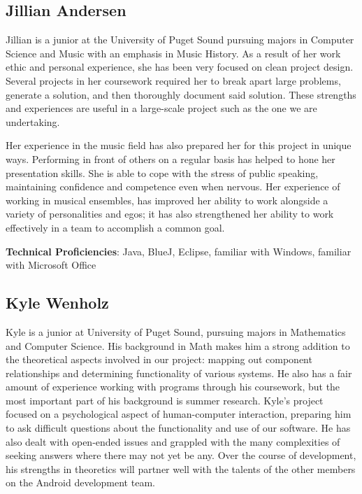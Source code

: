 \documentclass[12pt]{article}
\begin{document}
\subsection{Jillian Andersen}
Jillian is a junior at the University of Puget Sound pursuing majors in Computer Science and Music
with an emphasis in Music History. As a result of her work ethic and personal experience, she has been very focused on clean project design. Several projects in her coursework required her to break apart large problems, generate a solution, and then thoroughly document said solution.  These strengths and experiences are
useful in a large-scale project such as the one we are undertaking.

Her experience in the music field has also prepared her for this project in unique ways.
Performing in front of others on a regular basis has helped to hone her presentation skills. She is
able to cope with the stress of public speaking, maintaining confidence and competence even when
nervous. Her experience of working in musical ensembles, has improved her ability to work
alongside a variety of personalities and egos; it has also strengthened her ability to work
effectively in a team to accomplish a common goal.

\vspace*{5mm}

\noindent \textbf{Technical Proficiencies}: Java, BlueJ, Eclipse, familiar with Windows, familiar with Microsoft Office


\subsection{Kyle Wenholz}
Kyle is a junior at University of Puget Sound, pursuing majors in Mathematics and Computer Science.  His background in Math makes him a strong addition to the theoretical aspects involved in our project: mapping out component relationships and determining functionality of various systems.  He also has a fair amount of experience working with programs through his coursework, but the most important part of his background is summer research.  Kyle's project focused on a psychological aspect of human-computer interaction, preparing him to ask difficult questions about the functionality and use of our software.  He has also dealt with open-ended issues and grappled with the many complexities of seeking answers where there may not yet be any.  Over the course of development, his strengths in theoretics will partner well with the talents of the other members on the Android development team.
\end{document}
